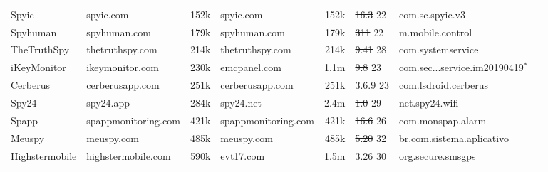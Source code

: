 \documentclass[sigconf,balance=false]{acmart}
\newcommand{\ltgrey}{\rowcolor[gray]{0.88}} %
\providecommand{\DIFdel}[1]{{\protect\color{red}\sout{#1}}}                      %
\providecommand{\DIFdelFL}[1]{\DIFdel{#1}} %
\providecommand{\DIFdelbeginFL}{} %
\providecommand{\DIFdelendFL}{} %
\newcommand{\DIFscaledelfig}{0.5}
\newlength{\DIFdelgraphicswidth} %
\newlength{\DIFdelgraphicsheight} %
\newcommand{\DIFdelincludegraphics}[2][]{%
\sbox{\DIFdelgraphicsbox}{\DIFOincludegraphics[#1]{#2}}%
\settoboxwidth{\DIFdelgraphicswidth}{\DIFdelgraphicsbox} %
\settoboxtotalheight{\DIFdelgraphicsheight}{\DIFdelgraphicsbox} %
\scalebox{\DIFscaledelfig}{%
\parbox[b]{\DIFdelgraphicswidth}{\usebox{\DIFdelgraphicsbox}\\[-\baselineskip] \rule{\DIFdelgraphicswidth}{0em}}\llap{\resizebox{\DIFdelgraphicswidth}{\DIFdelgraphicsheight}{%
\setlength{\unitlength}{\DIFdelgraphicswidth}%
\begin{picture}(1,1)%
\thicklines\linethickness{2pt} %
{\color[rgb]{1,0,0}\put(0,0){\framebox(1,1){}}}%
{\color[rgb]{1,0,0}\put(0,0){\line( 1,1){1}}}%
{\color[rgb]{1,0,0}\put(0,1){\line(1,-1){1}}}%
\end{picture}%
}\hspace*{3pt}}} %
} %
\DeclareRobustCommand{\DIFdelbeginFL}{\DIFOdelbeginFL \let\includegraphics\DIFdelincludegraphics} %
\DeclareRobustCommand{\DIFdelendFL}{\DIFOaddendFL \let\includegraphics\DIFOincludegraphics} %
\begin{document}
\begin{table*}[t]
\begin{tabular}{@{}llrlrll@{\hskip 5pt}l}
    \ltgrey Spyic        &spyic.com                &152k            &spyic.com  &152k                                &\DIFdelbeginFL \DIFdelFL{16.3              }%
\DIFdelendFL 22         &com.sc.spyic.v3                                 \\
    Spyhuman             &spyhuman.com             &179k            & spyhuman.com  &179k                            &\DIFdelbeginFL \DIFdelFL{311               }%
\DIFdelendFL 22              &m.mobile.control                                \\
    TheTruthSpy          &thetruthspy.com          &214k            & thetruthspy.com &214k                          &\DIFdelbeginFL \DIFdelFL{9.41              }%
\DIFdelendFL 28               &com.systemservice                               \\
    iKeyMonitor          &ikeymonitor.com          &230k            &emcpanel.com  &1.1m                             &\DIFdelbeginFL \DIFdelFL{9.8               }%
\DIFdelendFL 23        &com.sec...service.im20190419$^{*}$  \\
    \ltgrey Cerberus     &cerberusapp.com          &251k            & cerberusapp.com  &251k                         &\DIFdelbeginFL \DIFdelFL{3.6.9             }%
\DIFdelendFL 23             &com.lsdroid.cerberus                            \\
    \ltgrey Spy24        &spy24.app                &284k            & spy24.net  &2.4m                               &\DIFdelbeginFL \DIFdelFL{1.0               }%
\DIFdelendFL 29          &net.spy24.wifi                                  \\
    \ltgrey Spapp        &spappmonitoring.com      &421k            &spappmonitoring.com  &421k                      &\DIFdelbeginFL \DIFdelFL{16.6              }%
\DIFdelendFL 26                  &com.monspap.alarm                               \\
    Meuspy               &meuspy.com               &485k            & meuspy.com  &485k                              &\DIFdelbeginFL \DIFdelFL{5.20              }%
\DIFdelendFL 32        &br.com.sistema.aplicativo                       \\
    Highstermobile       &highstermobile.com       &590k            &evt17.com  &1.5m                                &\DIFdelbeginFL \DIFdelFL{3.26              }%
\DIFdelendFL 30       &org.secure.smsgps                               \\

\end{tabular}
\end{table*}
\end{document}
